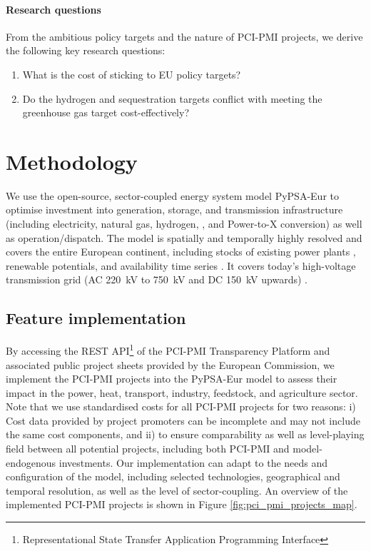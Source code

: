 \documentclass[final,5p,times,twocolumn]{elsarticle}
\let\autocite\cite
\begin{document}
\paragraph{Research questions} From the ambitious policy targets and the nature of PCI-PMI projects, we derive the following key research questions:

\begin{enumerate}
    \item What is the cost of sticking to EU policy targets?
    \item Do the hydrogen and sequestration targets conflict with meeting the greenhouse gas target cost-effectively?
 \end{enumerate}

\section{Methodology}
\label{sec:methodology}

We use the open-source, sector-coupled energy system model PyPSA-Eur \cite{neumannPotentialRoleHydrogen2023,frysztackiComparisonClusteringMethods2022,glaumOffshorePowerHydrogen2024,horschPyPSAEurOpenOptimisation2018} to optimise investment into generation, storage, and transmission infrastructure (including electricity, natural gas, hydrogen, , and Power-to-X conversion) as well as operation/dispatch. The model is spatially and temporally highly resolved and covers the entire European continent, including stocks of existing power plants \autocite{gotzensPerformingEnergyModelling2019}, renewable potentials, and availability time series \autocite{hofmannAtliteLightweightPython2021}. It covers today's high-voltage transmission grid (AC \SI{220}{kV} to \SI{750}{kV} and DC \SI{150}{kV} upwards) \autocite{xiongModellingHighVoltageGrid2024}.

\subsection{Feature implementation}
\label{sec:feature_implementation}

By accessing the REST API\footnote{Representational State Transfer Application Programming Interface} of the PCI-PMI Transparency Platform \autocite{europeancommissionPCIPMITransparencyPlatform2024} and associated public project sheets provided by the European Commission, we implement the PCI-PMI projects into the PyPSA-Eur model to assess their impact in the power, heat, transport, industry, feedstock, and agriculture sector. Note that we use standardised costs for all PCI-PMI projects \autocite{zeyenPyPSATechnologydataV0922024} for two reasons: i) Cost data provided by project promoters can be incomplete and may not include the same cost components, and ii) to ensure comparability as well as level-playing field between all potential projects, including both PCI-PMI and model-endogenous investments.
Our implementation can adapt to the needs and configuration of the model, including selected technologies, geographical and temporal resolution, as well as the level of sector-coupling. An overview of the implemented PCI-PMI projects is shown in Figure \ref{fig:pci_pmi_projects_map}.
\end{document}
